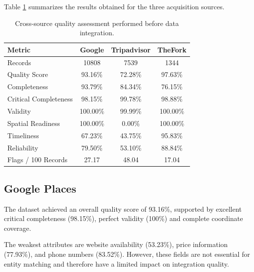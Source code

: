 Table \ref{tab:quality_summary} summarizes the results obtained for the three acquisition sources.

\begin{table}[t]
\centering

\begin{tabular}{p{4cm} c c c}
\toprule
\textbf{Metric} & \textbf{Google} & \textbf{Tripadvisor} & \textbf{TheFork} \\
\midrule

Records & 10808 & 7539 & 1344 \\

Quality Score & 93.16\% & 72.28\% & 97.63\% \\

Completeness & 93.79\% & 84.34\% & 76.15\% \\

Critical Completeness & 98.15\% & 99.78\% & 98.88\% \\

Validity & 100.00\% & 99.99\% & 100.00\% \\

Spatial Readiness & 100.00\% & 0.00\% & 100.00\% \\

Timeliness & 67.23\% & 43.75\% & 95.83\% \\

Reliability & 79.50\% & 53.10\% & 88.84\% \\

Flags / 100 Records & 27.17 & 48.04 & 17.04 \\

\bottomrule
\end{tabular}

\captionsetup{font=small}
\caption{Cross-source quality assessment performed before data integration.}
\label{tab:quality_summary}

\end{table}


\subsection{Google Places}

The dataset achieved an overall quality score of 93.16\%, supported by excellent critical completeness (98.15\%), perfect validity (100\%) and complete coordinate coverage.

The weakest attributes are website availability (53.23\%), price information (77.93\%), and phone numbers (83.52\%). However, these fields are not essential for entity matching and therefore have a limited impact on integration quality.


